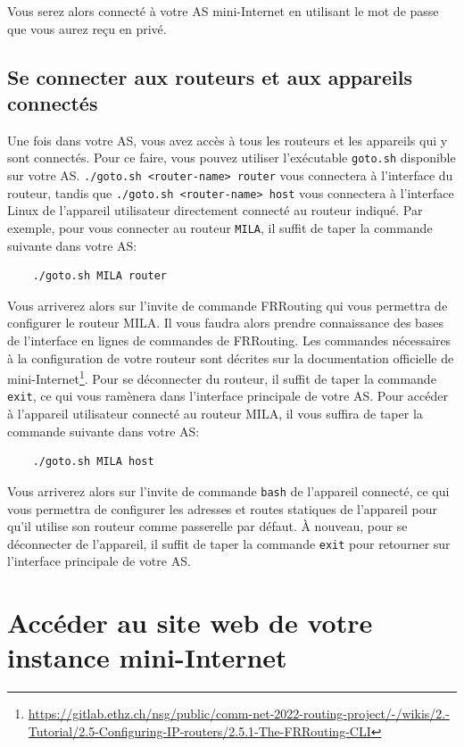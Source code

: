 \documentclass[a4paper, 11pt]{article}
\begin{document}
Vous serez alors connecté à votre AS mini-Internet en utilisant
le mot de passe que vous aurez reçu en privé.

\subsection{Se connecter aux routeurs et aux appareils connectés}

Une fois dans votre AS, vous avez accès à tous les routeurs et les
appareils qui y sont connectés. Pour ce faire, vous pouvez utiliser
l'exécutable \texttt{goto.sh} disponible sur votre AS.
\texttt{./goto.sh <router-name> router} vous connectera à l'interface
du routeur, tandis que \texttt{./goto.sh <router-name> host} vous
connectera à l'interface Linux de l'appareil utilisateur directement
connecté au routeur indiqué.
Par exemple, pour vous connecter au routeur \texttt{MILA}, il suffit
de taper la commande suivante dans votre AS:

\begin{verbatim}
    ./goto.sh MILA router
\end{verbatim}


Vous arriverez alors sur l'invite de commande FRRouting qui vous
permettra de configurer le routeur MILA.
Il vous faudra alors prendre connaissance des bases de l'interface
en lignes de commandes de FRRouting. Les commandes nécessaires
à la configuration de votre routeur sont décrites sur la documentation
officielle de 
mini-Internet\footnote{\url{https://gitlab.ethz.ch/nsg/public/comm-net-2022-routing-project/-/wikis/2.-Tutorial/2.5-Configuring-IP-routers/2.5.1-The-FRRouting-CLI}}.
Pour se déconnecter du
routeur, il suffit de taper la commande \texttt{exit}, ce qui vous
ramènera dans l'interface principale de votre AS.
Pour accéder à l'appareil utilisateur connecté au routeur MILA, il vous
suffira de taper la commande suivante dans votre AS:

\begin{verbatim}
    ./goto.sh MILA host
\end{verbatim}

Vous arriverez alors sur l'invite de commande \texttt{bash} de l'appareil
connecté, ce qui vous permettra de configurer les adresses et routes
statiques de l'appareil pour qu'il utilise son routeur comme
passerelle par défaut. À nouveau, pour se déconnecter de l'appareil,
il suffit de taper la commande \texttt{exit} pour retourner sur
l'interface principale de votre AS.

\section{Accéder au site web de votre instance mini-Internet}
\end{document}
